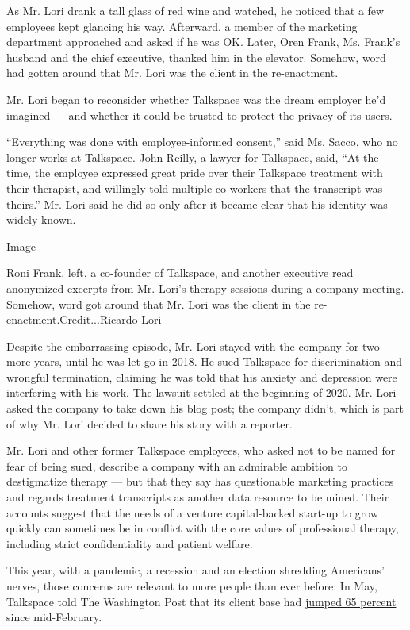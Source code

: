 As Mr. Lori drank a tall glass of red wine and watched, he noticed that
a few employees kept glancing his way. Afterward, a member of the
marketing department approached and asked if he was OK. Later, Oren
Frank, Ms. Frank's husband and the chief executive, thanked him in the
elevator. Somehow, word had gotten around that Mr. Lori was the client
in the re-enactment.

Mr. Lori began to reconsider whether Talkspace was the dream employer
he'd imagined --- and whether it could be trusted to protect the privacy
of its users.

``Everything was done with employee-informed consent,'' said Ms. Sacco,
who no longer works at Talkspace. John Reilly, a lawyer for Talkspace,
said, ``At the time, the employee expressed great pride over their
Talkspace treatment with their therapist, and willingly told multiple
co-workers that the transcript was theirs.'' Mr. Lori said he did so
only after it became clear that his identity was widely known.

Image

Roni Frank, left, a co-founder of Talkspace, and another executive read
anonymized excerpts from Mr. Lori's therapy sessions during a company
meeting. Somehow, word got around that Mr. Lori was the client in the
re-enactment.Credit...Ricardo Lori

Despite the embarrassing episode, Mr. Lori stayed with the company for
two more years, until he was let go in 2018. He sued Talkspace for
discrimination and wrongful termination, claiming he was told that his
anxiety and depression were interfering with his work. The lawsuit
settled at the beginning of 2020. Mr. Lori asked the company to take
down his blog post; the company didn't, which is part of why Mr. Lori
decided to share his story with a reporter.

Mr. Lori and other former Talkspace employees, who asked not to be named
for fear of being sued, describe a company with an admirable ambition to
destigmatize therapy --- but that they say has questionable marketing
practices and regards treatment transcripts as another data resource to
be mined. Their accounts suggest that the needs of a venture
capital-backed start-up to grow quickly can sometimes be in conflict
with the core values of professional therapy, including strict
confidentiality and patient welfare.

This year, with a pandemic, a recession and an election shredding
Americans' nerves, those concerns are relevant to more people than ever
before: In May, Talkspace told The Washington Post that its client base
had
\href{https://www.washingtonpost.com/health/2020/05/04/mental-health-coronavirus/}{jumped
65 percent} since mid-February.

